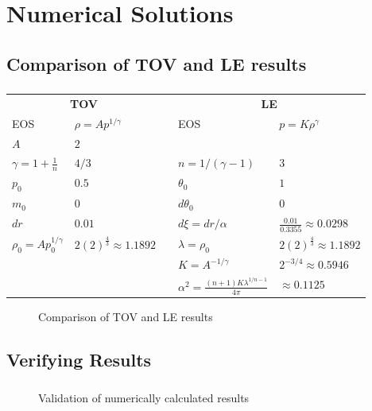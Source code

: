 \section{Numerical Solutions}

\subsection{Comparison of TOV and LE results}

\begin{frame}
	\frametitle{\insertsubsection}
	\begin{table}[H]
		\renewcommand{\arraystretch}{1.2}
		\centering
		\begin{tabular}{@{}llcll@{}}
			\toprule
			\multicolumn{2}{c}{\textbf{TOV}} & \phantom{b} &\multicolumn{2}{c}{\textbf{LE}}\\
			\cmidrule{1-2} \cmidrule{4-5}
			EOS & $\rho=Ap^{1/\gamma}$ && EOS & $p=K\rho^{\gamma}$\\
			$A$ & $2$ & & \\
			$\gamma=1+\frac{1}{n}$ & $4/3$ && $n=1/(\gamma-1)$ & $3$\\
			$p_0$ & $0.5$ && $\theta_0$ & $1$\\
			$m_0$ & $0$ && $d\theta_0$ & $0$\\
			$dr$ & $0.01$ && $d\xi=dr/\alpha$ & $\frac{0.01}{0.3355}\approx0.0298$\\
			\cmidrule{1-2} \cmidrule{4-5}
			$\rho_0=Ap_0^{1/\gamma}$ & $2(2)^{\frac{4}{3}}\approx1.1892$ && $\lambda=\rho_0$ & $2(2)^{\frac{4}{3}}\approx1.1892$\\
			&&& $K=A^{-1/\gamma}$ & $2^{-3/4}\approx0.5946$\\
			&&& $\alpha^2=\frac{(n+1)K\lambda^{1/n-1}}{4\pi}$ & $\approx0.1125$\\
			\bottomrule
		\end{tabular}
	\end{table}%
\end{frame}



\begin{frame}
	\begin{figure}
		\centering
		\caption{Comparison of TOV and LE results}
	\end{figure}
\end{frame}

\subsection{Verifying Results}
\begin{frame}
	\frametitle{\insertsubsection}
	\begin{figure}
		\centering
		\caption{Validation of numerically calculated results}
	\end{figure}
\end{frame}

